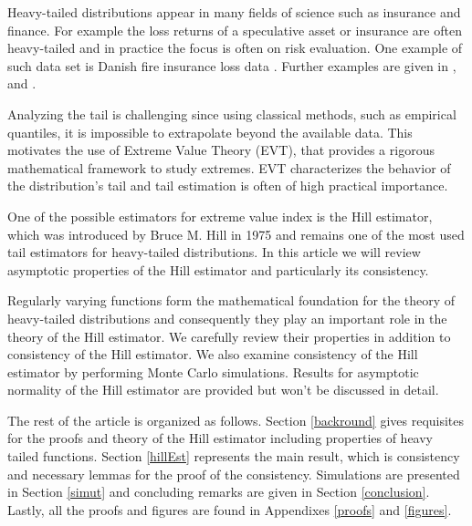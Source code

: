 \documentclass[english,12pt,a4paper,pdftex,sci,utf8]{aaltothesis} %
\newtheorem{definition}[theorem]{Definition}
\begin{document}
Heavy-tailed distributions appear in many fields of science such as insurance and finance. For example the loss returns of a speculative asset or insurance are often heavy-tailed and in practice the focus is often on risk evaluation. One example of such data set is Danish fire insurance loss data \cite{mcneil}  \cite{resnickFire}. Further examples are given in \cite{resnick}, \cite{deHaan} and \cite{embrechts}.

Analyzing the tail is challenging since using classical methods, such as empirical quantiles, it is impossible to extrapolate beyond the available data. This motivates the use of Extreme Value Theory (EVT), that provides a rigorous mathematical framework to study extremes. EVT characterizes the behavior of the distribution's tail and tail estimation is often of high practical importance.

One of the possible estimators for extreme value index is the Hill estimator, which was introduced by Bruce M. Hill in 1975 \cite{hill} and remains one of the most used tail estimators for heavy-tailed distributions.
In this article we will review asymptotic properties of the Hill estimator and particularly its consistency.

Regularly varying functions form the mathematical foundation for the theory of heavy-tailed distributions and consequently they play an important role in the theory of the Hill estimator. We carefully review their properties in addition to consistency of the Hill estimator. We also examine consistency of the Hill estimator by performing Monte Carlo simulations. Results for asymptotic normality of the Hill estimator are provided but won’t be discussed in detail.

The rest of the article is organized as follows. Section \ref{backround} gives requisites for the proofs and theory of the Hill estimator including properties of heavy tailed functions. Section \ref{hillEst} represents the main result, which is consistency and necessary lemmas for the proof of the consistency. Simulations are presented in Section \ref{simut} and concluding remarks are given in Section \ref{conclusion}. Lastly, all the proofs and figures are found in Appendixes \ref{proofs} and \ref{figures}.

\end{document}
